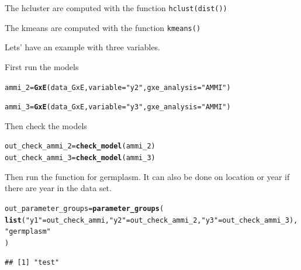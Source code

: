 \documentclass{book}\usepackage[]{graphicx}\usepackage[]{color}
\makeatletter
\newcommand{\hlstr}[1]{\textcolor[rgb]{0.192,0.494,0.8}{#1}}%
\newcommand{\hlstd}[1]{\textcolor[rgb]{0.345,0.345,0.345}{#1}}%
\newcommand{\hlkwb}[1]{\textcolor[rgb]{0.69,0.353,0.396}{#1}}%
\newcommand{\hlkwc}[1]{\textcolor[rgb]{0.333,0.667,0.333}{#1}}%
\newcommand{\hlkwd}[1]{\textcolor[rgb]{0.737,0.353,0.396}{\textbf{#1}}}%
\newenvironment{kframe}{%
 \def\at@end@of@kframe{}%
 \ifinner\ifhmode%
  \def\at@end@of@kframe{\end{minipage}}%
  \begin{minipage}{\columnwidth}%
 \fi\fi%
 \def\FrameCommand##1{\hskip\@totalleftmargin \hskip-\fboxsep
 \colorbox{shadecolor}{##1}\hskip-\fboxsep
     \hskip-\linewidth \hskip-\@totalleftmargin \hskip\columnwidth}%
 \MakeFramed {\advance\hsize-\width
   \@totalleftmargin\z@ \linewidth\hsize
   \@setminipage}}%
 {\par\unskip\endMakeFramed%
 \at@end@of@kframe}
\newenvironment{knitrout}{}{} %
\makeatother
\begin{document}
The hcluster are computed with the function \texttt{hclust(dist())}

The kmeans are computed with the function \texttt{kmeans()}

Lets' have an example with three variables.

First run the models
\begin{knitrout}
\color{fgcolor}\begin{kframe}
\begin{alltt}
\hlstd{ammi_2} \hlkwb{=} \hlkwd{GxE}\hlstd{(data_GxE,} \hlkwc{variable} \hlstd{=} \hlstr{"y2"}\hlstd{,} \hlkwc{gxe_analysis} \hlstd{=} \hlstr{"AMMI"}\hlstd{)}
\end{alltt}


{\ttfamily\noindent\itshape\color{messagecolor}{\#\# AMMI model done for y2}}\begin{alltt}
\hlstd{ammi_3} \hlkwb{=} \hlkwd{GxE}\hlstd{(data_GxE,} \hlkwc{variable} \hlstd{=} \hlstr{"y3"}\hlstd{,} \hlkwc{gxe_analysis} \hlstd{=} \hlstr{"AMMI"}\hlstd{)}
\end{alltt}


{\ttfamily\noindent\itshape\color{messagecolor}{\#\# AMMI model done for y3}}\end{kframe}
\end{knitrout}

Then check the models
\begin{knitrout}
\color{fgcolor}\begin{kframe}
\begin{alltt}
\hlstd{out_check_ammi_2} \hlkwb{=} \hlkwd{check_model}\hlstd{(ammi_2)}
\hlstd{out_check_ammi_3} \hlkwb{=} \hlkwd{check_model}\hlstd{(ammi_3)}
\end{alltt}
\end{kframe}
\end{knitrout}

Then run the function for germplasm. It can also be done on location or year if there are year in the data set.

\begin{knitrout}
\color{fgcolor}\begin{kframe}
\begin{alltt}
\hlstd{out_parameter_groups} \hlkwb{=} \hlkwd{parameter_groups}\hlstd{(}
  \hlkwd{list}\hlstd{(}\hlstr{"y1"} \hlstd{= out_check_ammi,} \hlstr{"y2"} \hlstd{= out_check_ammi_2,} \hlstr{"y3"} \hlstd{= out_check_ammi_3),}
  \hlstr{"germplasm"}
  \hlstd{)}
\end{alltt}
\begin{verbatim}
## [1] "test"
\end{verbatim}
\end{kframe}
\end{knitrout}
\end{document}
